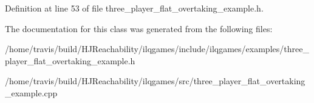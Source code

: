 Definition at line 53 of file three\+\_\+player\+\_\+flat\+\_\+overtaking\+\_\+example.\+h.



The documentation for this class was generated from the following files\+:\begin{DoxyCompactItemize}
\item 
/home/travis/build/\+H\+J\+Reachability/ilqgames/include/ilqgames/examples/three\+\_\+player\+\_\+flat\+\_\+overtaking\+\_\+example.\+h\item 
/home/travis/build/\+H\+J\+Reachability/ilqgames/src/three\+\_\+player\+\_\+flat\+\_\+overtaking\+\_\+example.\+cpp\end{DoxyCompactItemize}

